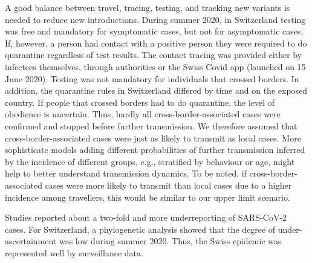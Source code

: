 \documentclass[10pt, a4paper, twoside]{article}
\begin{document}
\begin{multicols}{2}
A good balance between travel, tracing, testing, and tracking new variants is needed to reduce new introductions.
During summer 2020, in Switzerland testing was free and mandatory for symptomatic cases, but not for asymptomatic cases.
If, however, a person had contact with a positive person they were required to do quarantine regardless of test results.
The contact tracing was provided either by infectees themselves, through authorities or the Swiss Covid app (launched on 15 June 2020).\cite{salath_early_2020}
Testing was not mandatory for individuals that crossed borders.
In addition, the quarantine rules in Switzerland differed by time and on the exposed country.
If people that crossed borders had to do quarantine, the level of obedience is uncertain.
Thus, hardly all cross-border-associated cases were confirmed and stopped before further transmission.
We therefore assumed that cross-border-associated cases were just as likely to transmit as local cases.
More sophisticate models adding different probabilities of further transmission inferred by the incidence of different groups, e.g., stratified by behaviour or age, might help to better understand transmission dynamics.
To be noted, if cross-border-associated cases were more likely to transmit than local cases due to a higher incidence among travellers, this would be similar to our upper limit scenario.
\break
\par
Studies reported about a two-fold and more underreporting of SARS-CoV-2 cases.\cite{Li_substantial_2020,Wu_substantial_2020}
For Switzerland, a phylogenetic analysis showed that the degree of under-ascertainment was low during summer 2020.\cite{nadeau_quantifying_2020}
Thus, the Swiss epidemic was represented well by surveillance data.


\end{multicols}
\end{document}

